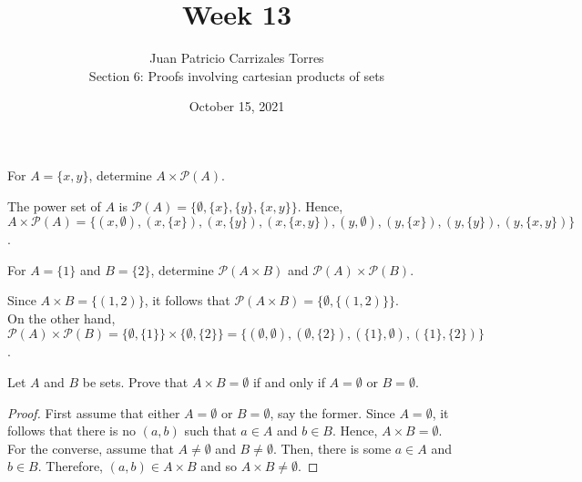 \documentclass[12pt]{article}
\newenvironment{problem}[2][Problem]{\begin{trivlist}
		\item[\hskip \labelsep {\bfseries #1}\hskip \labelsep {\bfseries #2.}]}{\end{trivlist}}
\newenvironment{solution}[2][Solution]{\begin{trivlist}
		\item[\hskip \labelsep {\bfseries #1}\hskip \labelsep {\bfseries #2.}]}{\end{trivlist}}
\begin{document}
	
	\title{Week 13}
	\author{Juan Patricio Carrizales Torres \\
		Section 6: Proofs involving cartesian products of sets}
	\date{October 15, 2021}
	\maketitle

	\begin{problem}{60}
		For $A=\{x,y\}$, determine $A\times \mathcal{P}(A)$.
		\begin{solution}{}
			The power set of $A$ is $\mathcal{P}(A) = \{\emptyset, \{x\},\{y\},\{x,y\}\}$. Hence, $A\times \mathcal{P}(A) = \{(x,\emptyset),(x,\{x\}),(x,\{y\}),(x,\{x,y\}),(y,\emptyset),(y,\{x\}),(y,\{y\}),(y,\{x,y\})\}$.
		\end{solution}
	\end{problem}

	\begin{problem}{61}
		For $A=\{1\}$ and $B=\{2\}$, determine $\mathcal{P}(A\times B)$ and $\mathcal{P}(A)\times \mathcal{P}(B)$.
		\begin{solution}{}
			Since $A\times B = \{(1,2)\}$, it follows that $\mathcal{P}(A\times B) = \{\emptyset, \{(1,2)\}\}$.\\
			On the other hand, $\mathcal{P}(A)\times \mathcal{P}(B) = \{\emptyset, \{1\}\}\times \{\emptyset, \{2\}\} = \{(\emptyset, \emptyset), (\emptyset,\{2\}), (\{1\},\emptyset), (\{1\},\{2\})\}$.
		\end{solution}
	\end{problem}

	\begin{problem}{62}
		Let $A$ and $B$ be sets. Prove that $A\times B = \emptyset$ if and only if $A=\emptyset$ or $B=\emptyset$.
		\begin{proof}
			First assume that either $A=\emptyset$ or $B=\emptyset$, say the former. Since $A=\emptyset$, it follows that there is no $(a,b)$ such that $a\in A$ and $b\in B$. Hence, $A\times B = \emptyset$.\\
			For the converse, assume that $A\neq \emptyset$ and $B\neq \emptyset$. Then, there is some $a\in A$ and $b\in B$. Therefore, $(a,b)\in A\times B$ and so $A\times B \neq \emptyset$.
		\end{proof}
	\end{problem}
\end{document}
